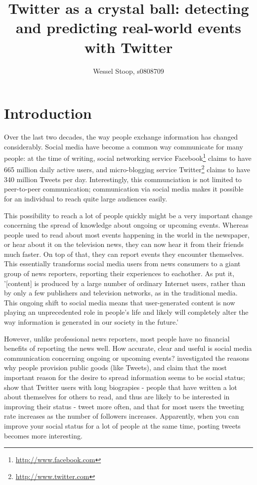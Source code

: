 \documentclass[12pt]{article}
\title{Twitter as a crystal ball: detecting and predicting real-world events with Twitter}
\author{Wessel Stoop, s0808709}
\begin{document}
\maketitle

\section{Introduction}
Over the last two decades, the way people exchange information has changed considerably. Social media have become a common way communicate for many people: at the time of writing, social networking service Facebook\footnote{\url{http://www.facebook.com}} claims to have 665 million daily active users, and micro-blogging service Twitter\footnote{\url{http://www.twitter.com}} claims to have 340 million Tweets per day. Interestingly, this communciation is not limited to peer-to-peer communication; communication via social media makes it possible for an individual to reach quite large audiences easily. 

This possibility to reach a lot of people quickly might be a very important change concerning the spread of knowledge about ongoing or upcoming events. Whereas people used to read about most events happening in the world in the newspaper, or hear about it on the television news, they can now hear it from their friends much faster. On top of that, they can report events they encounter themselves. This essentially transforms social media users from news consumers to a giant group of news reporters, reporting their experiences to eachother. As  put it, '[content] is produced by a large number of ordinary Internet users, rather than by only a few publishers and television networks, as in the traditional media. This ongoing shift to social media means that user-generated content is now playing an unprecedented role in people’s life and likely will completely alter the way information is generated in our society in the future.'

However, unlike professional news reporters, most people have no financial benefits of reporting the news well. How accurate, clear and useful is social media communication concerning ongoing or upcoming events?  investigated the reasons why people provision public goods (like Tweets), and claim that the most important reason for the desire to spread information seems to be social status;  show that Twitter users with long biograpies - people that have written a lot about themselves for others to read, and thus are likely to be interested in improving their status - tweet more often, and that for most users the tweeting rate increases as the number of followers increases. Apparently, when you can improve your social status for a lot of people at the same time, posting tweets becomes more interesting.
\end{document}
